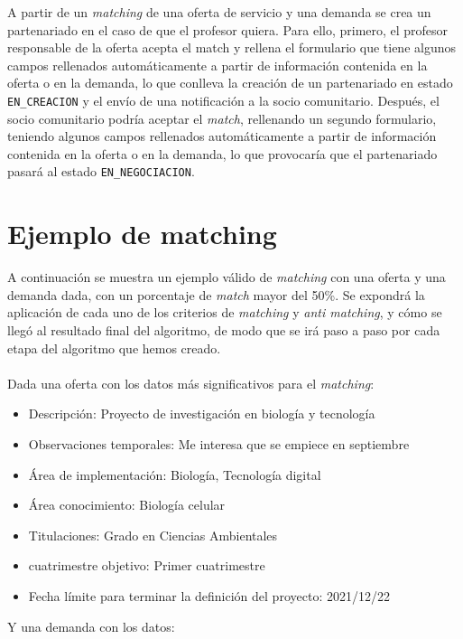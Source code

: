\documentclass[11pt]{book}
\begin{document}
A partir de un \emph{matching} de una oferta de servicio y una demanda se crea un partenariado en el caso de que el profesor quiera. Para ello, primero, el profesor responsable de la oferta acepta el match y rellena el formulario que tiene  algunos campos rellenados automáticamente a partir de información contenida en la oferta o en la demanda, lo que conlleva la creación de un partenariado en estado \texttt{EN\_CREACION} y el envío de una notificación a la socio comunitario. Después, el socio comunitario podría aceptar el \emph{match}, rellenando un segundo formulario, teniendo algunos campos rellenados automáticamente a partir de información contenida en la oferta o en la demanda, lo que provocaría que el partenariado pasará al estado \texttt{EN\_NEGOCIACION}.
\section{Ejemplo de matching}
A continuación se muestra un ejemplo válido de \emph{matching} con una oferta y una demanda dada, con un porcentaje de \emph{match} mayor del 50\%. Se expondrá la aplicación de cada uno de los criterios de \emph{matching} y \emph{anti matching}, y cómo se llegó al resultado final del algoritmo, de modo que se irá paso a paso por cada etapa del algoritmo que hemos creado.\\\\
Dada una oferta con los datos más significativos para el \emph{matching}:\\
\begin{itemize} 
	\item Descripción: Proyecto de investigación en biología y tecnología
	\item Observaciones temporales: Me interesa que se empiece en septiembre
	\item Área de implementación: Biología, Tecnología digital
	\item Área conocimiento: Biología celular
	\item Titulaciones: Grado en Ciencias Ambientales
	\item cuatrimestre objetivo: Primer cuatrimestre
	\item Fecha límite para terminar la definición del proyecto: 2021/12/22
	\\
\end{itemize}
Y una demanda con los datos:\\
\end{document}
